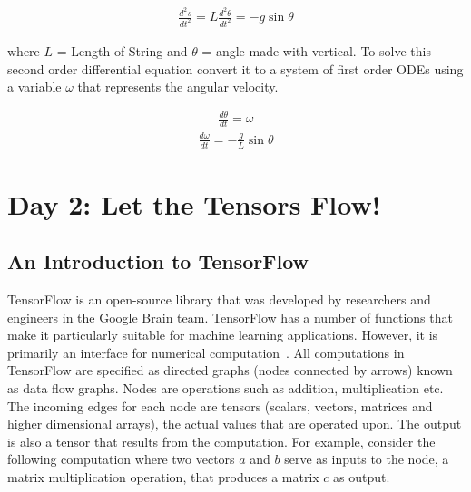 \documentclass[10pt,letterpaper]{article}
\begin{document}
\begin{eqnarray}\frac{d^2s}{dt^2}=L\frac{d^2\theta}{dt^2}=-g\sin{\theta}\end{eqnarray}

where $L$ = Length of String and $\theta$ = angle made with vertical. To solve this second order differential equation convert it to a system of first order ODEs using a variable $\omega$ that represents the angular velocity.

\begin{eqnarray}\frac{d\theta}{dt}=\omega \end{eqnarray}
\begin{eqnarray}\frac{d\omega}{dt}=-\frac{g}{L}\sin{\theta} \end{eqnarray}

\section*{Day 2: Let the Tensors Flow!}

\subsection*{An Introduction to TensorFlow}

TensorFlow is an open-source library that was developed by researchers and engineers in the Google Brain team. TensorFlow has a number of functions that make it particularly suitable for machine learning applications. However, it is primarily an interface for numerical computation~\cite {tensorflow2015-whitepaper}. All computations in TensorFlow are specified as directed graphs (nodes connected by arrows) known as data flow graphs. Nodes are operations such as addition, multiplication etc. The incoming edges for each node are tensors (scalars, vectors, matrices and higher dimensional arrays), the actual values that are operated upon. The output is also a tensor that results from the computation. For example, consider the following computation where two vectors $a$ and $b$ serve as inputs to the node, a matrix multiplication operation, that produces a matrix $c$ as output.
\end{document}
